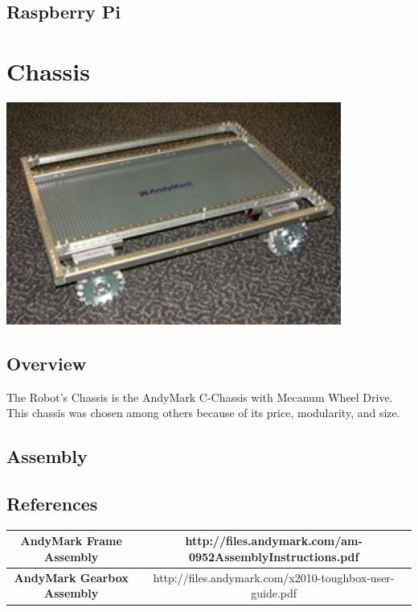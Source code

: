 \documentclass[letterpaper,12pt]{article}
\begin{document}
\subsection{Raspberry Pi}

\section{Chassis}
\begin{center}
    \includegraphics[width=11cm]{pics/chassis/andymark_chassis.jpg}
\end{center}

\subsection{Overview}
The Robot's Chassis is the AndyMark C-Chassis with Mecanum Wheel Drive. This
chassis was chosen among others because of its price, modularity, and size.

\subsection{Assembly}
\subsection{References}

\begin{table}[h!]
  \begin{tabular}{| c | c |}
    \hline
    \textbf{AndyMark Frame Assembly} &  http://files.andymark.com/am-0952AssemblyInstructions.pdf\\
    \hline
    \textbf{AndyMark Gearbox Assembly} &  http://files.andymark.com/x2010-toughbox-user-guide.pdf\\
    \hline
  \end{tabular}
  \label{tab:fire_cmd_msg}
\end{table}
\end{document}
